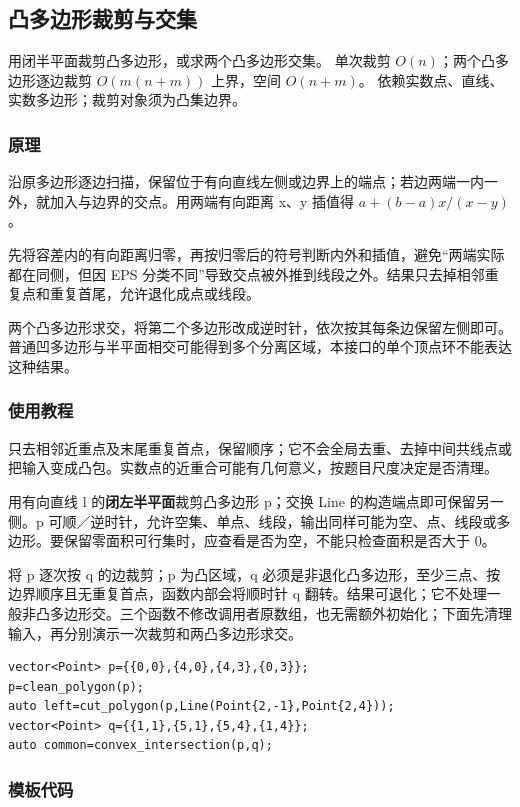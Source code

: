 \subsection{凸多边形裁剪与交集}
\label{geo:polygon-cut}
\AlgorithmInfo
    {用闭半平面裁剪凸多边形，或求两个凸多边形交集。}
    {单次裁剪 $O(n)$；两个凸多边形逐边裁剪 $O(m(n+m))$ 上界，空间 $O(n+m)$。}
    {依赖实数点、直线、实数多边形；裁剪对象须为凸集边界。}
\subsubsection*{原理}

沿原多边形逐边扫描，保留位于有向直线左侧或边界上的端点；若边两端一内一外，就加入与边界的交点。用两端有向距离 x、y 插值得 $a+(b-a)x/(x-y)$。

先将容差内的有向距离归零，再按归零后的符号判断内外和插值，避免“两端实际都在同侧，但因 EPS 分类不同”导致交点被外推到线段之外。结果只去掉相邻重复点和重复首尾，允许退化成点或线段。

两个凸多边形求交，将第二个多边形改成逆时针，依次按其每条边保留左侧即可。普通凹多边形与半平面相交可能得到多个分离区域，本接口的单个顶点环不能表达这种结果。

\subsubsection*{使用教程}
 只去相邻近重点及末尾重复首点，保留顺序；它不会全局去重、去掉中间共线点或把输入变成凸包。实数点的近重合可能有几何意义，按题目尺度决定是否清理。

 用有向直线 l 的\textbf{闭左半平面}裁剪凸多边形 p；交换 Line 的构造端点即可保留另一侧。p 可顺／逆时针，允许空集、单点、线段，输出同样可能为空、点、线段或多边形。要保留零面积可行集时，应查看是否为空，不能只检查面积是否大于 0。

 将 p 逐次按 q 的边裁剪；p 为凸区域，q 必须是非退化凸多边形，至少三点、按边界顺序且无重复首点，函数内部会将顺时针 q 翻转。结果可退化；它不处理一般非凸多边形交。三个函数不修改调用者原数组，也无需额外初始化；下面先清理输入，再分别演示一次裁剪和两凸多边形求交。
\begin{lstlisting}[style=mtycpp,numbers=none]
vector<Point> p={{0,0},{4,0},{4,3},{0,3}};
p=clean_polygon(p);
auto left=cut_polygon(p,Line(Point{2,-1},Point{2,4}));
vector<Point> q={{1,1},{5,1},{5,4},{1,4}};
auto common=convex_intersection(p,q);
\end{lstlisting}
\subsubsection*{模板代码}
